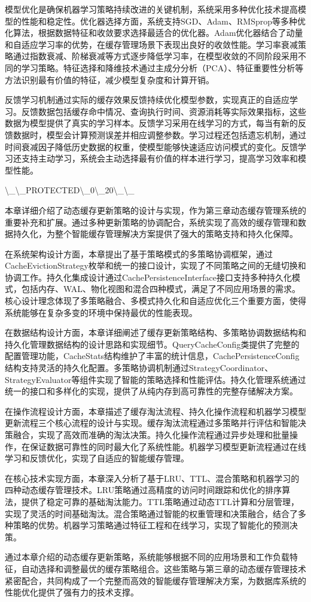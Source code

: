 模型优化是确保机器学习策略持续改进的关键机制，系统采用多种优化技术提高模型的性能和稳定性。优化器选择方面，系统支持SGD、Adam、RMSprop等多种优化算法，根据数据特征和收敛要求选择最适合的优化器。Adam优化器结合了动量和自适应学习率的优势，在缓存管理场景下表现出良好的收敛性能。学习率衰减策略通过指数衰减、阶梯衰减等方式逐步降低学习率，在模型收敛的不同阶段采用不同的学习策略。特征选择和降维技术通过主成分分析（PCA）、特征重要性分析等方法识别最有价值的特征，减少模型复杂度和计算开销。

反馈学习机制通过实际的缓存效果反馈持续优化模型参数，实现真正的自适应学习。反馈数据包括缓存命中情况、查询执行时间、资源消耗等实际效果指标，这些数据为模型提供了真实的学习样本。反馈学习采用在线学习的方式，每当有新的反馈数据时，模型会计算预测误差并相应调整参数。学习过程还包括遗忘机制，通过时间衰减因子降低历史数据的权重，使模型能够快速适应访问模式的变化。反馈学习还支持主动学习，系统会主动选择最有价值的样本进行学习，提高学习效率和模型性能。

\textbackslash{}_\textbackslash{}_PROTECTED\textbackslash{}_0\textbackslash{}_20\textbackslash{}_\textbackslash{}_

本章详细介绍了动态缓存更新策略的设计与实现，作为第三章动态缓存管理系统的重要补充和扩展。通过多种更新策略的协调配合，系统实现了高效的缓存管理和数据持久化，为整个智能缓存管理解决方案提供了强大的策略支持和持久化保障。

在系统架构设计方面，本章提出了基于策略模式的多策略协调框架，通过CacheEvictionStrategy枚举和统一的接口设计，实现了不同策略之间的无缝切换和协调工作。持久化集成设计通过CachePersistenceInterface接口支持多种持久化模式，包括内存、WAL、物化视图和混合四种模式，满足了不同应用场景的需求。核心设计理念体现了多策略融合、多模式持久化和自适应优化三个重要方面，使得系统能够在复杂多变的环境中保持最优的性能表现。

在数据结构设计方面，本章详细阐述了缓存更新策略结构、多策略协调数据结构和持久化管理数据结构的设计思路和实现细节。QueryCacheConfig类提供了完整的配置管理功能，CacheStats结构维护了丰富的统计信息，CachePersistenceConfig结构支持灵活的持久化配置。多策略协调机制通过StrategyCoordinator、StrategyEvaluator等组件实现了智能的策略选择和性能评估。持久化管理系统通过统一的接口和多样化的实现，提供了从纯内存到高可靠性的完整存储解决方案。

在操作流程设计方面，本章描述了缓存淘汰流程、持久化操作流程和机器学习模型更新流程三个核心流程的设计与实现。缓存淘汰流程通过多策略并行评估和智能决策融合，实现了高效而准确的淘汰决策。持久化操作流程通过异步处理和批量操作，在保证数据可靠性的同时最大化了系统性能。机器学习模型更新流程通过在线学习和反馈优化，实现了自适应的智能缓存管理。

在核心技术实现方面，本章深入分析了基于LRU、TTL、混合策略和机器学习的四种动态缓存管理技术。LRU策略通过高精度的访问时间跟踪和优化的排序算法，提供了稳定可靠的基础淘汰能力。TTL策略通过动态TTL计算和分层管理，实现了灵活的时间基础淘汰。混合策略通过智能的权重管理和决策融合，结合了多种策略的优势。机器学习策略通过特征工程和在线学习，实现了智能化的预测决策。

通过本章介绍的动态缓存更新策略，系统能够根据不同的应用场景和工作负载特征，自动选择和调整最优的缓存策略组合。这些策略与第三章的动态缓存管理技术紧密配合，共同构成了一个完整而高效的智能缓存管理解决方案，为数据库系统的性能优化提供了强有力的技术支撑。